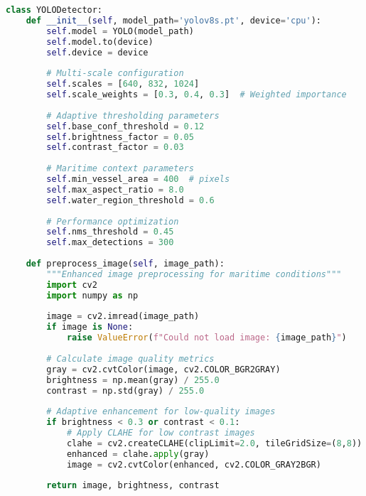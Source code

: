 \documentclass[a4paper,11pt]{article}
\begin{document}
\begin{lstlisting}[language=Python, caption=Enhanced YOLO Detector Initialization]
class YOLODetector:
    def __init__(self, model_path='yolov8s.pt', device='cpu'):
        self.model = YOLO(model_path)
        self.model.to(device)
        self.device = device
        
        # Multi-scale configuration
        self.scales = [640, 832, 1024]
        self.scale_weights = [0.3, 0.4, 0.3]  # Weighted importance
        
        # Adaptive thresholding parameters
        self.base_conf_threshold = 0.12
        self.brightness_factor = 0.05
        self.contrast_factor = 0.03
        
        # Maritime context parameters
        self.min_vessel_area = 400  # pixels
        self.max_aspect_ratio = 8.0
        self.water_region_threshold = 0.6
        
        # Performance optimization
        self.nms_threshold = 0.45
        self.max_detections = 300
        
    def preprocess_image(self, image_path):
        """Enhanced image preprocessing for maritime conditions"""
        import cv2
        import numpy as np
        
        image = cv2.imread(image_path)
        if image is None:
            raise ValueError(f"Could not load image: {image_path}")
            
        # Calculate image quality metrics
        gray = cv2.cvtColor(image, cv2.COLOR_BGR2GRAY)
        brightness = np.mean(gray) / 255.0
        contrast = np.std(gray) / 255.0
        
        # Adaptive enhancement for low-quality images
        if brightness < 0.3 or contrast < 0.1:
            # Apply CLAHE for low contrast images
            clahe = cv2.createCLAHE(clipLimit=2.0, tileGridSize=(8,8))
            enhanced = clahe.apply(gray)
            image = cv2.cvtColor(enhanced, cv2.COLOR_GRAY2BGR)
            
        return image, brightness, contrast
\end{lstlisting}
\end{document}

